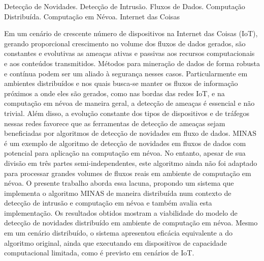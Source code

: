\begin{resumo}{Detecção de Novidades. Detecção de Intrusão. Fluxos de Dados.
   Computação Distribuída. Computação em Névoa. Internet das Coisas}

   Em um cenário de crescente número de dispositivos na Internet das Coisas
   (IoT), gerando proporcional crescimento no volume dos fluxos de dados
   gerados,
   são constantes e evolutivas as ameaças ativas e passivas aos recursos
   computacionais e aos conteúdos transmitidos.
   Métodos para mineração de dados de forma robusta e contínua podem ser um
   aliado à segurança nesses casos.
   Particularmente em ambientes distribuídos e nos quais busca-se manter os
   fluxos de informação próximos a onde eles são gerados, como nas bordas das
   redes IoT, e na computação em névoa de maneira geral, a detecção de ameaças é
   essencial e não trivial.
   Além disso, a evolução constante dos tipos de dispositivos e de tráfegos
   nessas redes favorece que as ferramentas de detecção de ameaças sejam
   beneficiadas por algoritmos de detecção de novidades em fluxo de dados.
   MINAS é um exemplo de algoritmo de detecção de novidades em fluxos de dados
   com potencial para aplicação na computação em névoa.
   No entanto, apesar de sua divisão em três partes semi-independentes, este
   algoritmo ainda não foi adaptado para processar grandes volumes de fluxos
   reais em ambiente de computação em névoa.
   O presente trabalho aborda essa lacuna, propondo um sistema que implementa o
   algoritmo MINAS de maneira distribuída num contexto de detecção de intrusão e
   computação em névoa e também avalia esta implementação.
   Os resultados obtidos mostram a viabilidade do modelo de detecção de
   novidades distribuído em ambiente de computação em névoa.
   Mesmo em um cenário distribuído, o sistema apresentou eficácia equivalente a
   do algoritmo original, ainda que executando em dispositivos de capacidade
   computacional limitada, como é previsto em cenários de IoT.

\end{resumo}

